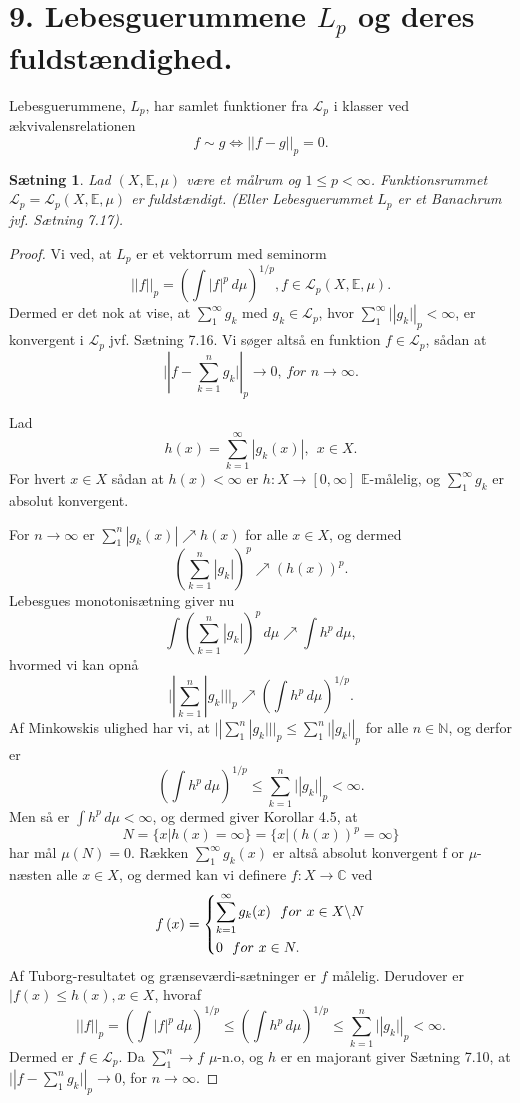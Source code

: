 \documentclass[12pt]{report}
\newtheorem{theorem}[lemma]{Sætning}
\theoremstyle{break}
\newtheorem*{proof}{Bevis}
\theoremstyle{break}
\newcommand{\Int}[1]{\int#1\,d\mu}
\newcommand{\EE}{\mathbb{E}}
\renewcommand{\L}{\mathcal{L}}
\newcommand{\laengde}[1]{\lvert|#1\rvert|}
\begin{document}
\section*{9. Lebesguerummene $L_p$ og deres fuldstændighed.}
Lebesguerummene, $L_p$, har samlet funktioner fra $\L_p$ i klasser ved ækvivalensrelationen \[f\sim g\Leftrightarrow\laengde{f-g}_p=0.\]
\begin{theorem}
Lad $(X,\EE,\mu)$ være et målrum og $1\leq p<\infty$. Funktionsrummet $\L_p=\L_p(X,\EE,\mu)$ er fuldstændigt. (Eller Lebesguerummet $L_p$ er et Banachrum jvf. Sætning 7.17).
\end{theorem}
\begin{proof}
Vi ved, at $L_p$ er et vektorrum med seminorm \[\laengde{f}_p=\left(\Int{|f|^p}\right)^{1/p}, f\in\L_p(X,\EE,\mu).\] Dermed er det nok at vise, at  $\sum_1^\infty g_k$ med $g_k\in\L_p$, hvor $\sum_1^\infty \laengde{g_k}_p < \infty$, er konvergent i $\L_p$ jvf. Sætning 7.16. Vi søger altså en funktion $f\in\L_p$, sådan at \[\laengde{f-\sum\limits_{k=1}^ng_k}_p\to 0,\, for\,\,n\to\infty.\]

\bigskip

Lad \[h(x)=\sum\limits_{k=1}^\infty|g_k(x)|,~~x\in X.\]
For hvert $x\in X$ sådan at $h(x)<\infty$ er $h\colon X\to[0,\infty]$ $\EE$-målelig, og $\sum_1^\infty g_k$ er absolut konvergent.

\bigskip

For $n\to\infty$ er $\sum_1^n|g_k(x)|\nearrow h(x)$ for alle $x\in X$, og dermed
\[\left(\sum\limits_{k=1}^n|g_k|\right)^p\nearrow (h(x))^p.\]
Lebesgues monotonisætning giver nu
\[\Int{\left(\sum\limits_{k=1}^n|g_k|\right)^p}\nearrow\Int{h^p},\]
hvormed vi kan opnå
\[\laengde{\sum\limits_{k=1}^n|g_k|}_p\nearrow\left(\Int{h^p}\right)^{1/p}.\]
Af Minkowskis ulighed har vi, at $\laengde{\sum_1^n|g_k|}_p\leq\sum_1^n\laengde{g_k}_p$ for alle $n\in\mathbb{N}$, og derfor er
\[\left(\Int{h^p}\right)^{1/p}\leq \sum\limits_{k=1}^n\laengde{g_k}_p<\infty.\]
Men så er $\Int{h^p}<\infty$, og dermed giver Korollar 4.5, at 
\[N=\{x\vert h(x)=\infty\}=\{x\vert (h(x))^p=\infty\}\]
har mål $\mu(N)=0$. Rækken $\sum_1^\infty g_k(x)$ er altså absolut konvergent f or $\mu$-næsten alle $x\in X$, og dermed kan vi definere $f\colon X\to\mathbb{C}$ ved
\[f\left( x \right) = \left\{ \begin{gathered}
  \sum_{k=1}^\infty g_k(x) \hfill ~~for\,\, x\in X\backslash N \\
  0~~for\,\, x\in N. \hfill \\ 
\end{gathered}  \right.\]
Af Tuborg-resultatet og grænseværdi-sætninger er $f$ målelig. Derudover er $|f(x)\leq h(x), x\in X$, hvoraf
\[\laengde{f}_p=\left(\Int{|f|^p}\right)^{1/p}\leq\left(\Int{h^p}\right)^{1/p}\leq\sum\limits_{k=1}^n\laengde{g_k}_p<\infty.\]
Dermed er $f\in\L_p$. Da $\sum_1^n\to f$ $\mu$-n.o, og $h$ er en majorant giver Sætning 7.10, at $\laengde{f-\sum_1^n g_k}_p\to 0$, for $n\to\infty$.
\end{proof}
\end{document}
